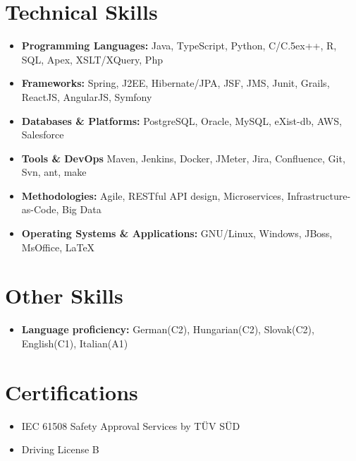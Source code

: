 \documentclass[11pt,a4paper,oneside]{article}
\def\Cplusplus{{\rm C\raise.5ex\hbox{\tiny ++}}}
\begin{document}
\section{\bf Technical Skills}
\begin{adjustwidth}{1.5em}{2em}

\begin{itemize}[leftmargin=0em]
\item \textbf{Programming Languages:} Java, TypeScript, Python, C/\Cplusplus, R, SQL, Apex, XSLT/XQuery, Php
\item \textbf{Frameworks:} Spring, J2EE, Hibernate/JPA, JSF, JMS, Junit, Grails, ReactJS, AngularJS, Symfony
\item \textbf{Databases \& Platforms:}  PostgreSQL, Oracle, MySQL, eXist-db, AWS, Salesforce
\item \textbf{Tools \& DevOps} Maven, Jenkins, Docker, JMeter, Jira, Confluence, Git, Svn, ant, make
\item \textbf{Methodologies:} Agile, RESTful API design, Microservices, Infrastructure-as-Code, Big Data
\item \textbf{Operating Systems \& Applications:}  GNU/Linux, Windows, JBoss, MsOffice, \LaTeX
\end{itemize}
\end{adjustwidth}
\section{\bf Other Skills}
\begin{itemize}
\item \textbf{Language proficiency:} German(C2), Hungarian(C2), Slovak(C2), English(C1), Italian(A1)
\end{itemize}

\section{\bf Certifications}
\begin{itemize}
\item IEC 61508 Safety Approval Services by TÜV SÜD
\item Driving License B
\end{itemize}
\clearpage
\end{document}
